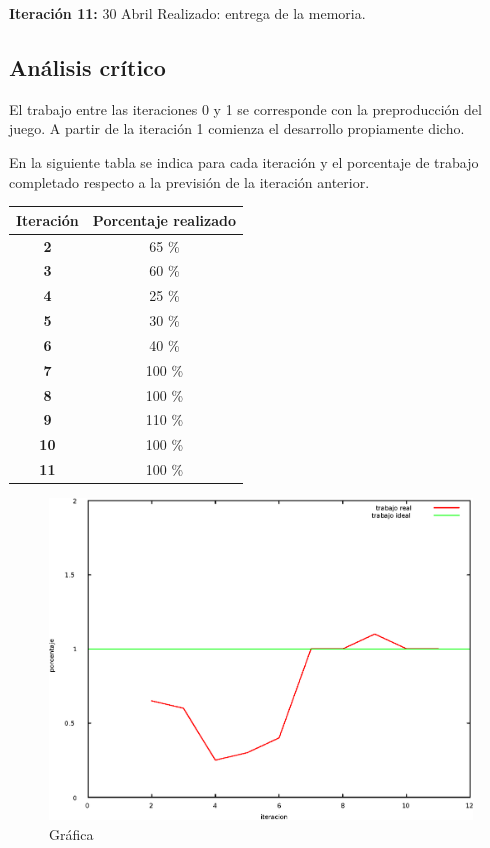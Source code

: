 \documentclass[12 pt, a4paper, twoside]{article}
\begin{document}
\textbf{Iteración 11:}
30 Abril
Realizado: entrega de la memoria.

\subsection{Análisis crítico}
El trabajo entre las iteraciones 0 y 1 se corresponde con la
preproducción del juego. A partir de la iteración 1 comienza el
desarrollo propiamente dicho.

En la siguiente tabla se indica para cada iteración y el porcentaje de trabajo completado
respecto a la previsión de la iteración anterior.



\begin{table}[!ht]
\begin{center}
    \begin{tabular}[!ht]{|c||c|} \hline
      \textbf{Iteración} & \textbf{Porcentaje realizado} \\ \hline
      \textbf{2} & 65 \% \\ \hline
      \textbf{3} & 60 \% \\ \hline
      \textbf{4} & 25 \% \\ \hline
      \textbf{5} & 30 \% \\ \hline
      \textbf{6} & 40 \% \\ \hline
      \textbf{7} & 100 \% \\ \hline
      \textbf{8} & 100 \% \\ \hline
      \textbf{9} & 110 \% \\ \hline
      \textbf{10} & 100 \% \\ \hline
      \textbf{11} & 100 \% \\ \hline
    \end{tabular}
\end{center}
\end{table}


\begin{figure}[h]
\centering
\includegraphics[width = 10 cm]{grafica.eps}
\caption{Gráfica}
\end{figure}
\end{document}
